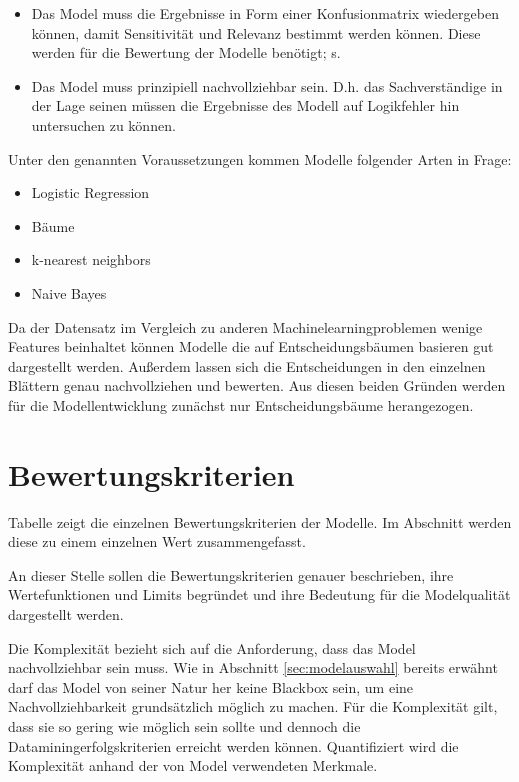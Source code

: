 \begin{itemize}
    \item Das Model muss die Ergebnisse in Form einer Konfusionmatrix wiedergeben können, damit Sensitivität und Relevanz bestimmt werden können.  Diese werden für die Bewertung der Modelle benötigt; s. 
    \item Das Model muss prinzipiell nachvollziehbar sein. D.h. das Sachverständige in der Lage seinen müssen die Ergebnisse des Modell auf Logikfehler hin untersuchen zu können. 
\end{itemize}

Unter den genannten Voraussetzungen kommen Modelle folgender Arten in Frage:
\begin{itemize}
    \item Logistic Regression
    \item Bäume
    \item k-nearest neighbors
    \item Naive Bayes
\end{itemize}

Da der Datensatz im Vergleich zu anderen Machinelearningproblemen wenige Features beinhaltet  können Modelle die auf Entscheidungsbäumen basieren gut dargestellt werden. Außerdem lassen sich die Entscheidungen in den einzelnen Blättern genau nachvollziehen und bewerten. Aus diesen beiden Gründen werden für die Modellentwicklung zunächst nur Entscheidungsbäume herangezogen. 

\section{Bewertungskriterien}
\label{sec:bewertungskriterien}

Tabelle  zeigt die einzelnen Bewertungskriterien der Modelle. Im Abschnitt  werden diese zu einem einzelnen Wert zusammengefasst. 

An dieser Stelle sollen die Bewertungskriterien genauer beschrieben, ihre Wertefunktionen und Limits begründet und ihre Bedeutung für die Modelqualität dargestellt werden.

Die Komplexität bezieht sich auf die Anforderung, dass das Model nachvollziehbar sein muss. Wie in Abschnitt \cref{sec:modelauswahl} bereits erwähnt darf das Model von seiner Natur her keine Blackbox sein, um eine Nachvollziehbarkeit grundsätzlich möglich zu machen. Für die Komplexität gilt, dass sie so gering wie möglich sein sollte und dennoch die Dataminingerfolgskriterien erreicht werden können. Quantifiziert wird die Komplexität anhand der von Model verwendeten Merkmale. 

